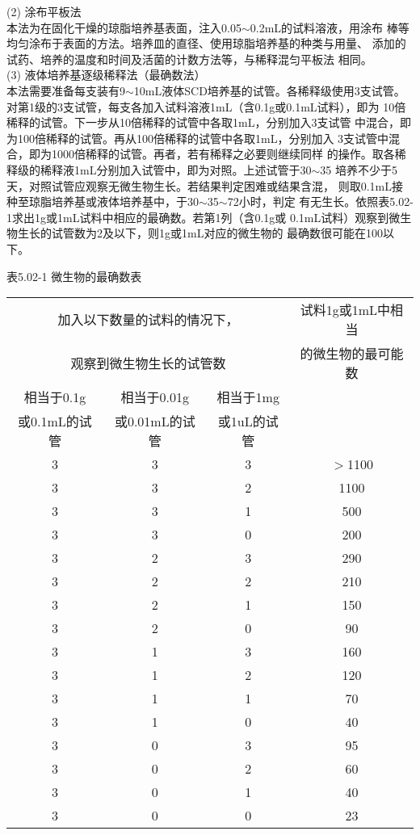 \documentclass[11pt,a4paper]{article}
\newenvironment{SC}{%
  \CJKfamily{gbsn}%
  \CJKtilde
  \CJKnospace}{}
\begin{document}
\begin{CJK}{UTF8}{}
\begin{SC}
(2) 涂布平板法\\
本法为在固化干燥的琼脂培养基表面，注入0.05$\sim$0.2mL的试料溶液，用涂布
棒等均匀涂布于表面的方法。培养皿的直径、使用琼脂培养基的种类与用量、
添加的试药、培养的温度和时间及活菌的计数方法等，与稀释混匀平板法
相同。\\

(3) 液体培养基逐级稀释法（最确数法）\\
本法需要准备每支装有9$\sim$10mL液体SCD培养基的试管。各稀释级使用3支试管。
对第1级的3支试管，每支各加入试料溶液1mL（含0.1g或0.1mL试料），即为
10倍稀释的试管。下一步从10倍稀释的试管中各取1mL，分别加入3支试管
中混合，即为100倍稀释的试管。再从100倍稀释的试管中各取1mL，分别加入
3支试管中混合，即为1000倍稀释的试管。再者，若有稀释之必要则继续同样
的操作。取各稀释级的稀释液1mL分别加入试管中，即为对照。上述试管于30$\sim$35\textcelsius
培养不少于5天，对照试管应观察无微生物生长。若结果判定困难或结果含混，
则取0.1mL接种至琼脂培养基或液体培养基中，于30$\sim$35$\sim$72小时，判定
有无生长。依照表5.02-1求出1g或1mL试料中相应的最确数。若第1列（含0.1g或
0.1mL试料）观察到微生物生长的试管数为2及以下，则1g或1mL对应的微生物的
最确数很可能在100以下。\\

\begin{table}[tb]
\begin{center}
表5.02-1 微生物的最确数表\\
\begin{tabular}{c|c|c|c}
\hline
\multicolumn{3}{c|}{加入以下数量的试料的情况下，}&试料1g或1mL中相当\\
\multicolumn{3}{c|}{观察到微生物生长的试管数}&的微生物的最可能数\\
\cline{1-3}
相当于0.1g&相当于0.01g&相当于1mg\\
或0.1mL的试管&或0.01mL的试管&或1uL的试管\\
\hline
3&3&3&$>$1100\\
3&3&2&1100\\
3&3&1&500\\
3&3&0&200\\
\hline
3&2&3&290\\
3&2&2&210\\
3&2&1&150\\
3&2&0&90\\
\hline
3&1&3&160\\
3&1&2&120\\
3&1&1&70\\
3&1&0&40\\
\hline
3&0&3&95\\
3&0&2&60\\
3&0&1&40\\
3&0&0&23\\
\hline
\end{tabular}
\end{center}
\end{table}


\end{SC}
\end{CJK}
\end{document}
